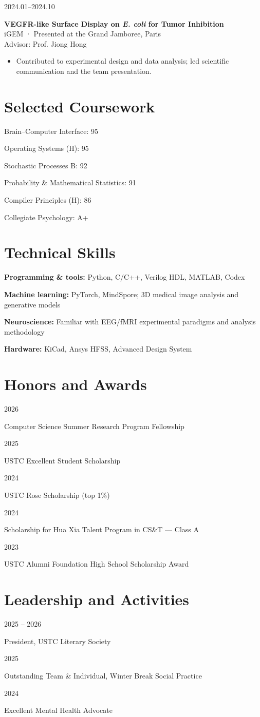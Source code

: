 \documentclass[10pt,a4paper]{article}
\newcommand{\entry}[2]{\noindent\begin{minipage}[t]{.19\linewidth}\small #1\end{minipage}\hfill\begin{minipage}[t]{.79\linewidth}#2\end{minipage}\par\vspace{7pt}}
\begin{document}
\entry{2024.01--2024.10}{\textbf{VEGFR-like Surface Display on \textit{E. coli} for Tumor Inhibition}\\
iGEM · Presented at the Grand Jamboree, Paris\\
Advisor: Prof. Jiong Hong
\begin{itemize}
\item Contributed to experimental design and data analysis; led scientific communication and the team presentation.
\end{itemize}}
\newpage\section*{Selected Coursework}
Brain--Computer Interface: 95\par
Operating Systems (H): 95\par
Stochastic Processes B: 92\par
Probability \& Mathematical Statistics: 91\par
Compiler Principles (H): 86\par
Collegiate Psychology: A+\par
\section*{Technical Skills}
\textbf{Programming \& tools:} Python, C/C++, Verilog HDL, MATLAB, Codex\par
\textbf{Machine learning:} PyTorch, MindSpore; 3D medical image analysis and generative models\par
\textbf{Neuroscience:} Familiar with EEG/fMRI experimental paradigms and analysis methodology\par
\textbf{Hardware:} KiCad, Ansys HFSS, Advanced Design System\par
\section*{Honors and Awards}
\entry{2026}{Computer Science Summer Research Program Fellowship}
\entry{2025}{USTC Excellent Student Scholarship}
\entry{2024}{USTC Rose Scholarship (top 1\%)}
\entry{2024}{Scholarship for Hua Xia Talent Program in CS\&T --- Class A}
\entry{2023}{USTC Alumni Foundation High School Scholarship Award}
\section*{Leadership and Activities}
\entry{2025 -- 2026}{President, USTC Literary Society}
\entry{2025}{Outstanding Team \& Individual, Winter Break Social Practice}
\entry{2024}{Excellent Mental Health Advocate}
\end{document}
